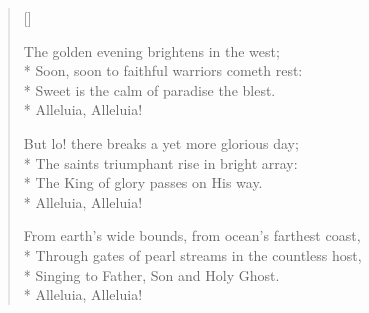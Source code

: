 \begin{verse}[\versewidth]
\begin{patverse}
The golden evening brightens in the west;\\*
        Soon, soon to faithful warriors cometh rest:\\*
    Sweet is the calm of paradise the blest.\\*
        Alleluia, Alleluia!
\end{patverse}

\begin{patverse}
But lo!    there    breaks a    yet more glorious day;\\*
        The saints triumphant rise in bright array:\\*
The King of glory passes on His way.\\*
Alleluia, Alleluia!
\end{patverse}

\begin{patverse}
From earth's wide bounds, from ocean's farthest coast,\\*
        Through gates of pearl streams in the countless host,\\*
    Singing to Father, Son and Holy Ghost.\\*
        Alleluia, Alleluia!
\end{patverse}

\end{verse}

